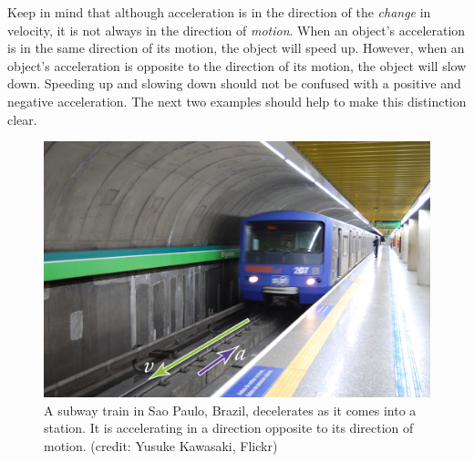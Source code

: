 \documentclass[
]{book}
\begin{document}
Keep in mind that although acceleration is in the direction of the
\emph{change} in velocity, it is not always in the direction of \emph{motion}.
When an object's acceleration is in the same direction of its motion,
the object will speed up. However, when an object's acceleration is
opposite to the direction of its motion, the object will slow down.
Speeding up and slowing down should not be confused with a positive and
negative acceleration. The next two examples should help to make this
distinction clear.

\begin{figure}
\hypertarget{import-auto-id1515319}{%
\centering
\includegraphics{images/Figure_02_04_00a.jpg}
\caption{A subway train in Sao Paulo, Brazil, decelerates as it comes into a
station. It is accelerating in a direction opposite to its direction of
motion. (credit: Yusuke Kawasaki,
Flickr)}\label{import-auto-id1515319}
}
\end{figure}
\end{document}
